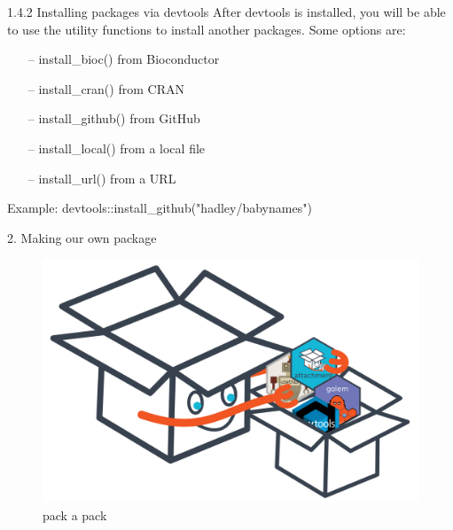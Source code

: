 \documentclass[11pt,a4paper]{beamer}
\begin{document}


\begin{frame}[t]{1.4.2 Installing packages via devtools}
After devtools is installed, you will be able to use the utility functions to install another packages. Some options are:
\begin{itemize}
	\item[--]install\_bioc() from Bioconductor
	\item[--]install\_cran() from CRAN
	\item[--]install\_github() from GitHub
	\item[--]install\_local() from a local file
	\item[--]install\_url() from a URL
\end{itemize}

Example: 
devtools::install\_github("hadley/babynames")


\end{frame}






\begin{frame}[t]{2. Making our own package}
	

	
	\begin{figure}
		\centering
		\includegraphics[width=0.7\linewidth]{user}
		
		\caption{pack a pack}
		\label{fig:packages}
	\end{figure}
	
	
\end{frame}
\end{document}
